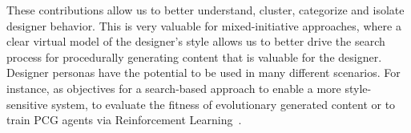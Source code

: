 





These contributions allow us to better understand, cluster, categorize and isolate designer behavior. This is very valuable for mixed-initiative approaches, where a clear virtual model of the designer's style allows us to better drive the search process for procedurally generating content that is valuable for the designer. Designer personas have the potential to be used in many different scenarios. For instance, as objectives for a search-based approach to enable a more style-sensitive system, to evaluate the fitness of evolutionary generated content or to train PCG agents via Reinforcement Learning~. 

